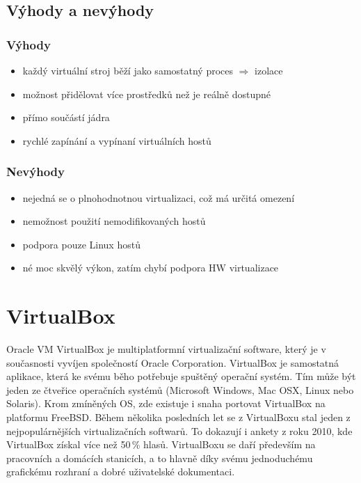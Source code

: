 \subsection{Výhody a nevýhody}
\subsubsection{Výhody}
\begin{itemize}
  \item každý virtuální stroj běží jako samostatný proces $\Rightarrow$ izolace
  \item možnost přidělovat více prostředků než je reálně dostupné
  \item přímo součástí jádra
  \item rychlé zapínání a vypínaní virtuálních hostů
\end{itemize}

\subsubsection{Nevýhody}
\begin{itemize}
  \item nejedná se o plnohodnotnou virtualizaci, což má určitá omezení
  \item nemožnost použití nemodifikovaných hostů
  \item podpora pouze Linux hostů
  \item né moc skvělý výkon, zatím chybí podpora HW virtualizace
\end{itemize}

\section{VirtualBox}
Oracle VM VirtualBox je multiplatformní virtualizační software, který je v současnosti vyvíjen společností Oracle Corporation. VirtualBox je samostatná aplikace, která ke svému běho potřebuje spuštěný operační systém. Tím může být jeden ze čtveřice operačních systémů (Microsoft Windows, Mac OSX, Linux nebo Solaris). Krom zmíněných OS, zde existuje i snaha portovat VirtualBox na platformu FreeBSD. Během několika posledních let se z VirtualBoxu stal jeden z nejpopulárnějších virtualizačních softwarů. To dokazují i ankety z roku 2010, kde VirtualBox získal více než 50\,\% hlasů. VirtualBoxu se daří především na pracovních a domácích stanicích, a to hlavně díky svému jednoduchému grafickému rozhraní a dobré uživatelské dokumentaci.

